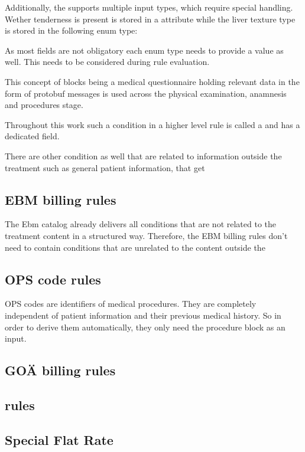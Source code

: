 Additionally, the \AVS supports multiple input types, which require special handling.
Wether tenderness is present is stored in a  attribute while the liver texture type is stored in the following enum type:


As most fields are not obligatory each enum type needs to provide a  value as well.
This needs to be considered during rule evaluation.

This concept of blocks being a medical questionnaire holding relevant data in the form of protobuf messages is used across the physical examination, anamnesis and procedures stage.

Throughout this work such a condition in a higher level rule is called a  and has a dedicated field.


There are other condition as well that are related to information outside the treatment such as general patient information, that get


\subsection{EBM billing rules}
The Ebm catalog already delivers all conditions that are not related to the treatment content in a structured way.
Therefore, the EBM billing rules don't need to contain conditions that are unrelated to the content outside the

\subsection{OPS code rules}
OPS codes are identifiers of medical procedures.
They are completely independent of patient information and their previous medical history.
So in order to derive them automatically, they only need the procedure block as an input.

\subsection{GOÄ billing rules}





\subsection{\MJ rules}




\subsection{Special Flat Rate}


